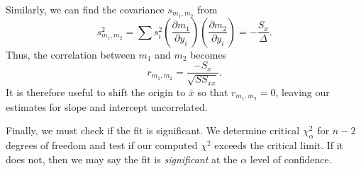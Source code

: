 Similarly, we can find the covariance $s_{m_1,m_2}$ from
\begin{equation}
s^2_{m_1,m_2} = \sum s ^2_i \left( \frac{\partial m_1}{\partial y_i} \right)
\left( \frac{\partial m_2}{\partial y_i}\right) = -\frac{S_x}{\Delta}.
\end{equation}
Thus, the correlation between $m_1$ and $m_2$ becomes
\begin{equation}
r_{m_1,m_2} = \frac{-S_x}{\sqrt{SS_{xx}}}.
\label{eq:uncorrelated_a_b}
\end{equation}
It is therefore useful to shift the origin to $\bar{x}$ so that $r_{m_1,m_2} = 0$, leaving our estimates for slope and intercept uncorrelated.  

	Finally, we must check if the fit is significant.  We determine 
critical $\chi ^2_\alpha$ for $n - 2$ degrees of freedom and test if our computed $\chi^2$ exceeds the critical limit.  If it 
does not, then we may say the fit is \emph{significant} at the $\alpha$ level of confidence.

